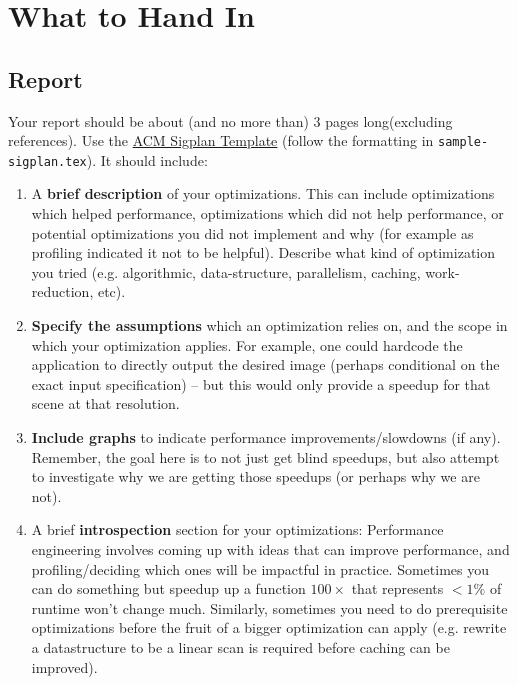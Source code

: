 \documentclass[11pt]{article}
\newcommand{\1}{ \mathbb{1} }
\begin{document}
\section{What to Hand In}
\subsection{Report}
\label{subsec:report}
Your report should be about (and no more than) $3$ pages long(excluding references). Use the \href{https://www.overleaf.com/latex/templates/association-for-computing-machinery-acm-sigplan-proceedings-template/rfvsrhgmghtc}{ACM Sigplan Template} (follow the formatting in \texttt{sample-sigplan.tex}). It should include:
\begin{enumerate}
    \item A \textbf{brief description} of your optimizations. This can include optimizations which helped performance, optimizations which did not help performance, or potential optimizations you did not implement and why (for example as profiling indicated it not to be helpful). Describe what kind of optimization you tried (e.g. algorithmic, data-structure, parallelism, caching, work-reduction, etc).
    \item \textbf{Specify the assumptions} which an optimization relies on, and the scope in which your optimization applies. For example, one could hardcode the application to directly output the desired image (perhaps conditional on the exact input specification) -- but this would only provide a speedup for that scene at that resolution.
    \item \textbf{Include graphs} to indicate performance improvements/slowdowns (if any). Remember, the goal here is to not just get blind speedups, but also attempt to investigate why we are getting those speedups (or perhaps why we are not). %
    \item A brief \textbf{introspection} section for your optimizations: Performance engineering involves coming up with ideas that can improve performance, and profiling/deciding which ones will be impactful in practice. Sometimes you can do something but speedup up a function $100\times$ that represents $<1\%$ of runtime won't change much. Similarly, sometimes you need to do prerequisite optimizations before the fruit of a bigger optimization can apply (e.g. rewrite a datastructure to be a linear scan is required before caching can be improved).
\end{enumerate}
\end{document}

